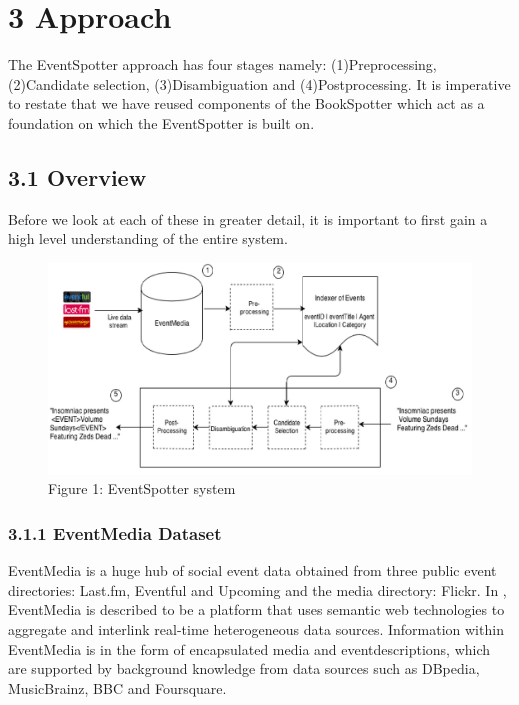 \documentclass[a4paper,11pt]{report}
\begin{document}


\chapter*{3 Approach}
The EventSpotter approach has four stages namely: (1)Preprocessing, (2)Candidate selection, (3)Disambiguation and (4)Postprocessing. It is imperative to restate that we have reused components of the BookSpotter which act as a foundation on which the EventSpotter is built on.

\section*{3.1 Overview}
Before we look at each of these in greater detail, it is important to first gain a high level understanding of the entire system.
\begin{figure}
\centering\includegraphics[width=12cm]{architecture}
\caption{Figure 1: EventSpotter system}
\end{figure}


\subsection*{3.1.1 EventMedia Dataset}
EventMedia is a huge hub of social event data obtained from three public event directories: Last.fm, Eventful and Upcoming and the media directory: Flickr. In \cite{EURECOM+3865}, EventMedia is described to be a platform that uses semantic web technologies to aggregate and interlink real-time heterogeneous data sources. Information within EventMedia is in the form of encapsulated media and eventdescriptions, which are supported by background knowledge from data sources such as DBpedia, MusicBrainz, BBC and Foursquare. 
\end{document}
